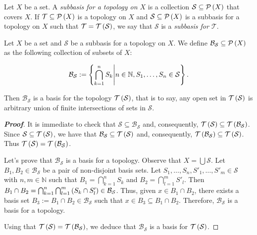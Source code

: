 \begin{definition}
  Let $X$ be a set. A \emph{subbasis for a topology on $X$} is a collection $\mathcal{S}\subseteq\mathcal{P}\left(X\right)$ that covers $X$. If $\mathcal{T}\subseteq\mathcal{P}\left(X\right)$ is a topology on $X$ and $\mathcal{S}\subseteq\mathcal{P}\left(X\right)$ is a subbasis for a topology on $X$ such that $\mathcal{T}=\mathcal{T}\left({\mathcal{S}}\right)$, we say that $\mathcal{S}$ is a \emph{subbasis for $\mathcal{T}$}.
\end{definition}

\begin{proposition}
  Let $X$ be a set and $\mathcal{S}$ be a subbasis for a topology on $X$. We define $\mathcal{B}_{\mathcal{S}}\subseteq\mathcal{P}\left(X\right)$ as the following collection of subsets of $X$:

  \begin{equation}
    \mathcal{B}_{\mathcal{S}}:=\left\{\bigcap_{k=1}^{n}{S_k}\middle|n\in\mathbb{N},S_1,\dots,S_n\in\mathcal{S}\right\}.
  \end{equation}

  Then $\mathcal{B}_{\mathcal{S}}$ is a basis for the topology $\mathcal{T}\left(\mathcal{S}\right)$, that is to say, any open set in $\mathcal{T}\left(\mathcal{S}\right)$ is arbitrary union of finite intersections of sets in $\mathcal{S}$.
  \begin{proof}[\rm\textbf{Proof}]
    It is immediate to check that $\mathcal{S}\subseteq\mathcal{B}_{\mathcal{S}}$ and, consequently, $\mathcal{T}\left(\mathcal{S}\right)\subseteq\mathcal{T}\left(\mathcal{B}_{\mathcal{S}}\right)$. Since $\mathcal{S}\subseteq\mathcal{T}\left(\mathcal{S}\right)$, we have that $\mathcal{B}_{\mathcal{S}}\subseteq\mathcal{T}\left(\mathcal{S}\right)$ and, consequently, $\mathcal{T}\left(\mathcal{B}_{\mathcal{S}}\right)\subseteq\mathcal{T}\left(\mathcal{S}\right)$. Thus $\mathcal{T}\left(\mathcal{S}\right)=\mathcal{T}\left(\mathcal{B}_{\mathcal{S}}\right)$.

    Let's prove that $\mathcal{B}_{\mathcal{S}}$ is a basis for a topology. Observe that $X=\bigcup{\mathcal{S}}$. Let $B_1,B_2\in\mathcal{B}_{\mathcal{S}}$ be a pair of non-disjoint basis sets. Let $S_1,\dots,S_n,S'_1,\dots,S'_m\in\mathcal{S}$ with $n,m\in\mathbb{N}$ such that $B_1=\bigcap_{k=1}^{n}{S_k}$ and $B_2=\bigcap_{l=1}^{m}{S'_l}$. Then $B_1\cap B_2=\bigcap_{k=1}^{n}{\bigcap_{l=1}^{m}{\left(S_k\cap S'_l\right)}}\in\mathcal{B}_{\mathcal{S}}$. Thus, given $x\in B_1\cap B_2$, there exists a basis set $B_3:=B_1\cap B_2\in\mathcal{B}_{\mathcal{S}}$ such that $x\in B_3\subseteq B_1\cap B_2$. Therefore, $\mathcal{B}_{\mathcal{S}}$ is a basis for a topology.

    Using that $\mathcal{T}\left(\mathcal{S}\right)=\mathcal{T}\left(\mathcal{B}_{\mathcal{S}}\right)$, we deduce that $\mathcal{B}_{\mathcal{S}}$ is a basis for $\mathcal{T}\left(\mathcal{S}\right)$.
  \end{proof}
\end{proposition}

